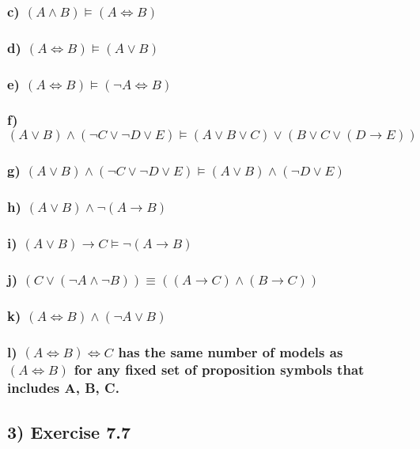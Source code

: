 \documentclass{article}
\begin{document}
	\subsubsection*{c) \((A \wedge B) \models (A \Leftrightarrow B)\)}
	\subsubsection*{d) \((A \Leftrightarrow B) \models (A \lor B)\)}
	\subsubsection*{e) \((A \Leftrightarrow B) \models (\lnot A \Leftrightarrow B)\)}
	\subsubsection*{f) \((A \lor B) \wedge (\lnot C \lor \lnot D \lor E) \models (A \lor B \lor C) \lor (B \lor C \lor (D \to E))\)}
	\subsubsection*{g) \((A \lor B) \wedge (\lnot C \lor \lnot D \lor E) \models (A \lor B) \wedge (\lnot D \lor E)\)}
	\subsubsection*{h) \((A \lor B) \wedge \lnot(A \to B)\)}
	\subsubsection*{i) \((A \lor B) \to C \models \lnot(A \to B)\)}
	\subsubsection*{j) \((C \lor (\lnot A \wedge \lnot B)) \equiv ((A \to C) \wedge (B \to C))\)}
	\subsubsection*{k) \((A \Leftrightarrow B) \wedge (\lnot A \lor B)\)}
	\subsubsection*{l) \((A \Leftrightarrow B) \Leftrightarrow C \) has the same number of models as \((A \Leftrightarrow B)\) for any fixed set of proposition symbols that includes A, B, C.}

\subsection*{3) Exercise 7.7}
\end{document}
